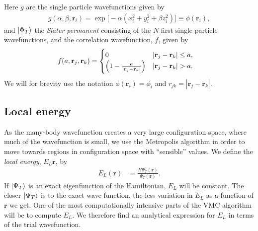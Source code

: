 \documentclass[
    a4paper, aps, twocolumn, floatfix, superscriptaddress, nofootinbib]{revtex4-1}
\newcommand{\vf}{\mathbf}
\newcommand{\1}{\mathds{1}}
\begin{document}
    Here $g$ are the single particle wavefunctions given by
    \begin{align}
        g(\alpha, \beta, \vf{r}_i)
        = \exp\bigl[
            -\alpha(x_i^2 + y_i^2 + \beta z_i^2)
        \bigr] \equiv \phi(\vf{r}_i),
    \end{align}
    and $\ket{\Phi_T}$ the \textit{Slater permanent} consisting of the $N$ first
    single particle wavefunctions, and the correlation wavefunction, $f$, given
    by
    \begin{align}
        f(a, \vf{r}_j, \vf{r}_k)
        &=
        \begin{cases}
            0 & |\vf{r}_j - \vf{r}_k| \leq a, \\
            \Bigl(
                1 - \frac{a}{|\vf{r}_j - \vf{r}_k|}
            \Bigr) & |\vf{r}_j - \vf{r}_k| > a.
        \end{cases}
    \end{align}
    We will for brevity use the notation $\phi(\vf{r}_i) = \phi_i$ and $r_{jk} =
    |\vf{r}_j - \vf{r}_k|$.

    \subsection{Local energy}
        As the many-body wavefunction creates a very large configuration space,
        where much of the wavefunction is small, we use the Metropolis algorithm
        in order to move towards regions in configuration space with
        ``sensible'' values. We define the \textit{local energy}, $E_L{\vf{r}}$,
        by
        \begin{align}
            E_L(\vf{r})
            &= \frac{H\Psi_T(\vf{r})}{\Psi_T(\vf{r})}.
        \end{align}
        If $\ket{\Psi_T}$ is an exact eigenfunction of the Hamiltonian, $E_L$
        will be constant. The closer $\ket{\Psi_T}$ is to the exact wave
        function, the less variation in $E_L$ as a function of $\vf{r}$ we get.
        One of the most computationally intensive parts of the VMC algorithm
        will be to compute $E_L$. We therefore find an analytical expression for
        $E_L$ in terms of the trial wavefunction.
\end{document}
